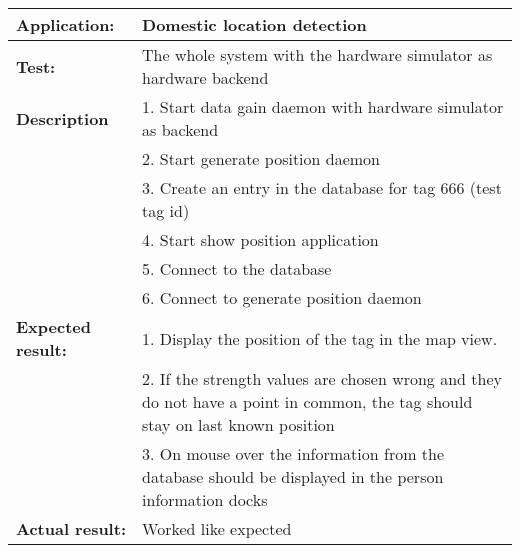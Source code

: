    \begin{tabular}{|p{3.5cm}|p{10.5cm}|}
    \hline
     \textbf{Application:}	& Domestic location detection\\
    \hline
     \textbf{Test:}		& The whole system with the hardware simulator as hardware backend\\
    \hline
     \textbf{Description}	& 1. Start data gain daemon with hardware simulator as backend\\
				& 2. Start generate position daemon\\
				& 3. Create an entry in the database for tag 666 (test tag id)\\
				& 4. Start show position application\\
				& 5. Connect to the database\\
				& 6. Connect to generate position daemon \\
    \hline
     \textbf{Expected result:}	& 1. Display the position of the tag in the map view.\\
				& 2. If the strength values are chosen wrong and they do not have a point in common, the tag should stay on last known position \\
				& 3. On mouse over the information from the database should be displayed in the person information docks\\
    \hline
     \textbf{Actual result:}	& Worked like expected\\
    \hline
   \end{tabular}\\
